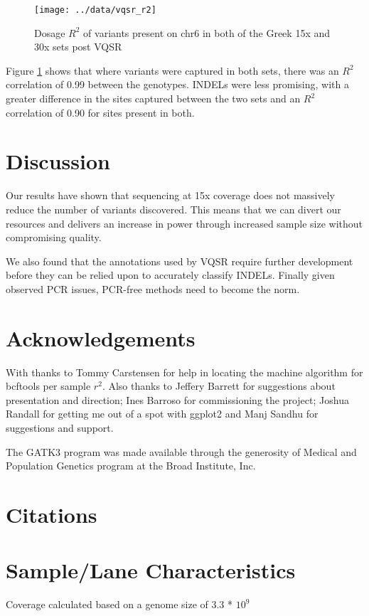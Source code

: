 \documentclass{article}
\begin{document}
  \begin{figure}
  \texttt{[image: ../data/vqsr\_r2]}
  \caption{Dosage $R^2$ of variants present on chr6 in both of the Greek 15x and 30x sets post VQSR}
  \label{fig:r2}
  \end{figure}

  {Figure \ref{fig:r2} shows that where variants were captured in both sets, there was an $R^2$ correlation of 0.99 between the genotypes. INDELs were less promising, with a greater difference in the sites captured between the two sets and an $R^2$ correlation of 0.90 for sites present in both.}

  \section{Discussion}

  {Our results have shown that sequencing at 15x coverage does not massively reduce the number of variants discovered. This means that we can divert our resources and delivers an increase in power through increased sample size without compromising quality.}

  {We also found that the annotations used by VQSR require further development before they can be relied upon to accurately classify INDELs. Finally given observed PCR issues, PCR-free methods need to become the norm.}

  \section{Acknowledgements}
  With thanks to Tommy Carstensen for help in locating the machine algorithm for bcftools
  per sample $r^{2}$. Also thanks to Jeffery Barrett for suggestions about presentation and direction;
  Ines Barroso for commissioning the project; Joshua Randall for getting me out of a spot
  with ggplot2 and Manj Sandhu for suggestions and support.

  The GATK3 program was made available through the generosity of Medical and
  Population Genetics program at the Broad Institute, Inc.

  \section{Citations}
  {}
  


  \newpage
  \appendix
  \section{Sample/Lane Characteristics}
  \label{app:lanes}
  Coverage calculated based on a genome size of 3.3 * $10^{9}$
  \begin{center}
  \end{center}
\end{document}

